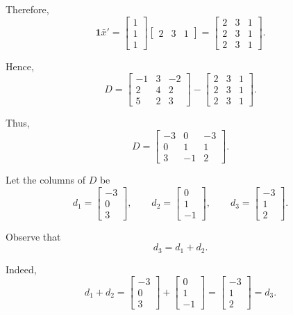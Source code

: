 \documentclass[12pt]{article}
\begin{document}
	Therefore,
	\[
	\mathbf{1}\bar{x}'
	=
	\begin{bmatrix}
		1\\1\\1
	\end{bmatrix}
	\begin{bmatrix}
		2&3&1
	\end{bmatrix}
	=
	\begin{bmatrix}
		2&3&1\\
		2&3&1\\
		2&3&1
	\end{bmatrix}.
	\]
	
	Hence,
	\[
	D
	=
	\begin{bmatrix}
		-1&3&-2\\
		2&4&2\\
		5&2&3
	\end{bmatrix}
	-
	\begin{bmatrix}
		2&3&1\\
		2&3&1\\
		2&3&1
	\end{bmatrix}.
	\]
	
	Thus,
	\[
	\boxed{
		D=
		\begin{bmatrix}
			-3&0&-3\\
			0&1&1\\
			3&-1&2
	\end{bmatrix}}.
	\]
	
	Let the columns of \(D\) be
	\[
	d_1=
	\begin{bmatrix}
		-3\\0\\3
	\end{bmatrix},
	\qquad
	d_2=
	\begin{bmatrix}
		0\\1\\-1
	\end{bmatrix},
	\qquad
	d_3=
	\begin{bmatrix}
		-3\\1\\2
	\end{bmatrix}.
	\]
	
	Observe that
	\[
	d_3=d_1+d_2.
	\]
	
	Indeed,
	\[
	d_1+d_2
	=
	\begin{bmatrix}
		-3\\0\\3
	\end{bmatrix}
	+
	\begin{bmatrix}
		0\\1\\-1
	\end{bmatrix}
	=
	\begin{bmatrix}
		-3\\1\\2
	\end{bmatrix}
	=d_3.
	\]
	
\end{document}
